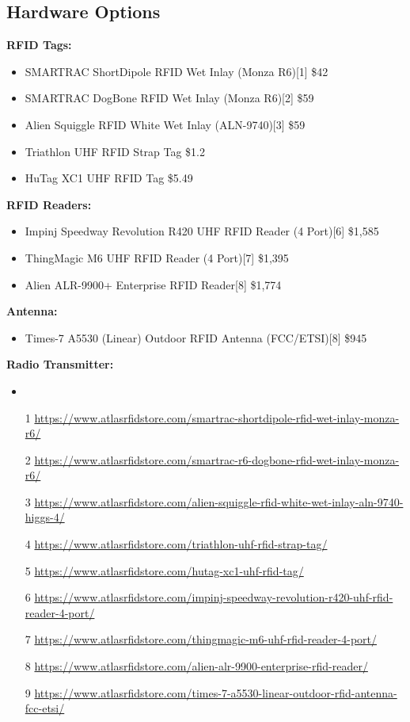 \documentclass{article}
\begin{document}
\subsection{Hardware Options}
 \textbf{RFID Tags:} 
 \begin{itemize}
	\item SMARTRAC ShortDipole RFID Wet Inlay (Monza R6)[1] \quad \$42
	\item SMARTRAC DogBone RFID Wet Inlay (Monza R6)[2] \quad	\$59
	\item Alien Squiggle RFID White Wet Inlay (ALN-9740)[3] \quad	\$59
	\item Triathlon UHF RFID Strap Tag \quad[4]	\$1.2
	\item HuTag XC1 UHF RFID Tag \quad[5] \$5.49

\end{itemize} 
 \textbf{RFID Readers:} 
  \begin{itemize}
	\item Impinj Speedway Revolution R420 UHF RFID Reader (4 Port)[6] \quad \$1,585
	\item ThingMagic M6 UHF RFID Reader (4 Port)[7] \quad \$1,395
	\item Alien ALR-9900+ Enterprise RFID Reader[8] \quad \$1,774
\end{itemize} 
 \textbf{Antenna:} 
 \begin{itemize}
	\item Times-7 A5530 (Linear) Outdoor RFID Antenna (FCC/ETSI)[8] \quad \$945
\end{itemize} 
\textbf{Radio Transmitter:} 
 \begin{itemize}
	\item
\end{itemize} 

 \begin{itemize}
	\item [1] \url{https://www.atlasrfidstore.com/smartrac-shortdipole-rfid-wet-inlay-monza-r6/ } 
	\item [2] \url{https://www.atlasrfidstore.com/smartrac-r6-dogbone-rfid-wet-inlay-monza-r6/ }
	\item [3] \url{https://www.atlasrfidstore.com/alien-squiggle-rfid-white-wet-inlay-aln-9740-higgs-4/}  
	\item [4] \url{https://www.atlasrfidstore.com/triathlon-uhf-rfid-strap-tag/}
	\item [5] \url{https://www.atlasrfidstore.com/hutag-xc1-uhf-rfid-tag/}
	\item [6] \url{https://www.atlasrfidstore.com/impinj-speedway-revolution-r420-uhf-rfid-reader-4-port/} 
	\item [7] \url{https://www.atlasrfidstore.com/thingmagic-m6-uhf-rfid-reader-4-port/} 
	\item [8] \url{https://www.atlasrfidstore.com/alien-alr-9900-enterprise-rfid-reader/} 
	\item [9] \url{https://www.atlasrfidstore.com/times-7-a5530-linear-outdoor-rfid-antenna-fcc-etsi/} 
\end{itemize}
\end{document}
